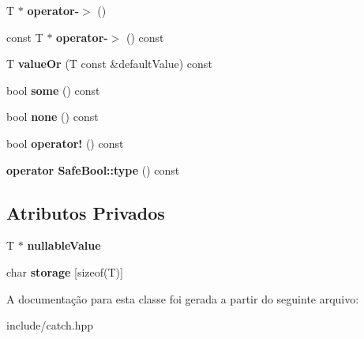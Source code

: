 \begin{DoxyCompactItemize}
\item 
T $\ast$ {\bfseries operator-\/$>$} ()\hypertarget{classCatch_1_1Option_acad340798a16c8f700f8763119e90f31}{}\label{classCatch_1_1Option_acad340798a16c8f700f8763119e90f31}

\item 
const T $\ast$ {\bfseries operator-\/$>$} () const \hypertarget{classCatch_1_1Option_a0800340b2971748671b88acfb14bb928}{}\label{classCatch_1_1Option_a0800340b2971748671b88acfb14bb928}

\item 
T {\bfseries value\+Or} (T const \&default\+Value) const \hypertarget{classCatch_1_1Option_a21b5629a7febbe3e23c475c9d9138a2d}{}\label{classCatch_1_1Option_a21b5629a7febbe3e23c475c9d9138a2d}

\item 
bool {\bfseries some} () const \hypertarget{classCatch_1_1Option_affa96f15798b4656fb753ff52d12dec2}{}\label{classCatch_1_1Option_affa96f15798b4656fb753ff52d12dec2}

\item 
bool {\bfseries none} () const \hypertarget{classCatch_1_1Option_a389324d2aa20ceb0eb0f48a5f77c20c8}{}\label{classCatch_1_1Option_a389324d2aa20ceb0eb0f48a5f77c20c8}

\item 
bool {\bfseries operator!} () const \hypertarget{classCatch_1_1Option_a47a1b6f6def2730ea9d27a1860a4f97f}{}\label{classCatch_1_1Option_a47a1b6f6def2730ea9d27a1860a4f97f}

\item 
{\bfseries operator Safe\+Bool\+::type} () const \hypertarget{classCatch_1_1Option_a637d4366ae7f0ded52ce59c8cb06da7b}{}\label{classCatch_1_1Option_a637d4366ae7f0ded52ce59c8cb06da7b}

\end{DoxyCompactItemize}
\subsection*{Atributos Privados}
\begin{DoxyCompactItemize}
\item 
T $\ast$ {\bfseries nullable\+Value}\hypertarget{classCatch_1_1Option_aa6643e8dc409f4fc86cc8c80f9c3266b}{}\label{classCatch_1_1Option_aa6643e8dc409f4fc86cc8c80f9c3266b}

\item 
char {\bfseries storage} \mbox{[}sizeof(T)\mbox{]}\hypertarget{classCatch_1_1Option_acdebca1b18bb8542c3f676b8dd805f23}{}\label{classCatch_1_1Option_acdebca1b18bb8542c3f676b8dd805f23}

\end{DoxyCompactItemize}


A documentação para esta classe foi gerada a partir do seguinte arquivo\+:\begin{DoxyCompactItemize}
\item 
include/catch.\+hpp\end{DoxyCompactItemize}

